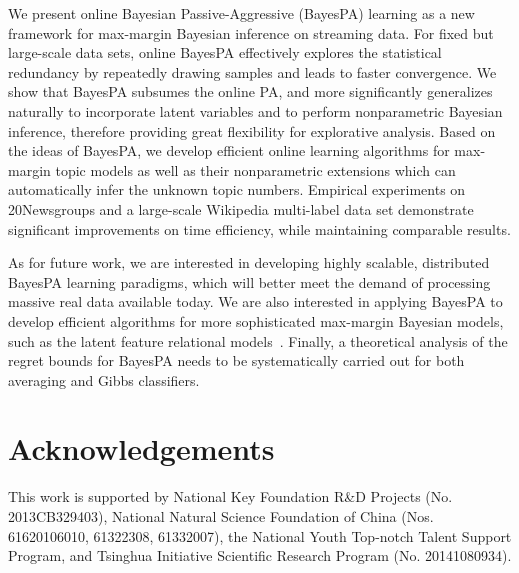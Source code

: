 \documentclass[twoside,11pt]{article}
\begin{document}
We present online Bayesian Passive-Aggressive (BayesPA) learning as a new framework for max-margin Bayesian inference on streaming data. For fixed but large-scale data sets, online BayesPA effectively explores the statistical redundancy by repeatedly drawing samples and leads to faster convergence. We show that BayesPA subsumes the online PA, and more significantly generalizes naturally to incorporate latent variables and to perform nonparametric Bayesian inference, therefore providing great flexibility for explorative analysis.
Based on the ideas of BayesPA, we develop efficient online learning algorithms for max-margin topic models as well as their nonparametric extensions which can automatically infer the unknown topic numbers. Empirical experiments on 20Newsgroups and a large-scale Wikipedia multi-label data set demonstrate significant improvements on time efficiency, while maintaining comparable results.

As for future work, we are interested in developing highly scalable, distributed \citep{broderick2013streaming} BayesPA learning paradigms, which will better meet the demand of processing massive real data available today. We are also interested in applying BayesPA to develop efficient algorithms for more sophisticated max-margin Bayesian models, such as the latent feature relational models~\citep{zhu2012maxlink}. Finally, a theoretical analysis of the regret bounds for BayesPA needs to be systematically carried out for both averaging and Gibbs classifiers.


\section*{Acknowledgements}

This work is supported by National Key Foundation R\&D Projects (No. 2013CB329403), 
National Natural Science Foundation of China (Nos. 61620106010, 61322308,
61332007), the National Youth Top-notch Talent Support Program, and Tsinghua Initiative Scientific Research Program (No.
20141080934).
\end{document}
